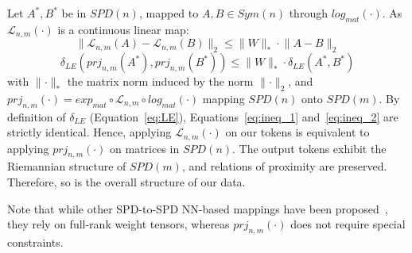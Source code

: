 \documentclass{article}
\begin{document}
Let $A^*, B^*$ be in $SPD(n)$, mapped to $A, B \in Sym(n)$ through $log_{mat}(\cdot)$. As $\mathcal{L}_{n, m}(\cdot)$ is a continuous linear map:
\begin{equation}
\label{eq:ineq_1}
\lVert \mathcal{L}_{n, m}(A) - \mathcal{L}_{n, m}(B) \rVert_2 \leq \lVert W \rVert_* \cdot \lVert A - B \rVert_2
\end{equation}
\begin{equation}
\label{eq:ineq_2}
\delta_{LE}(prj_{n, m}(A^*), prj_{n, m}(B^*)) \leq \lVert W \rVert_* \cdot \delta_{LE}(A^*, B^*)
\end{equation}
with $\lVert \cdot \rVert_*$ the matrix norm induced by the norm $\lVert \cdot \rVert_2$, and $prj_{n, m}(\cdot) = exp_{mat} \circ \mathcal{L}_{n, m} \circ log_{mat}(\cdot)$ mapping $SPD(n)$ onto $SPD(m)$.
By definition of $\delta_{LE}$ (Equation~\ref{eq:LE}), Equations~\ref{eq:ineq_1} and~\ref{eq:ineq_2} are strictly identical.
Hence, applying $\mathcal{L}_{n, m}(\cdot)$ on our tokens is equivalent to applying $prj_{n, m}(\cdot)$ on matrices in $SPD(n)$. The output tokens exhibit the Riemannian structure of $SPD(m)$, and relations of proximity are preserved. Therefore, so is the overall structure of our data.

Note that while other SPD-to-SPD NN-based mappings have been proposed~\cite{SPD_dim_reduc,huang2017spdnet}, they rely on full-rank weight tensors, whereas $prj_{n, m}(\cdot)$ does not require special constraints.
\end{document}
